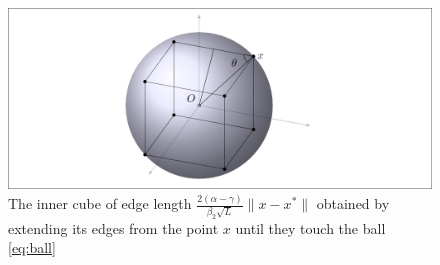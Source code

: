 \documentclass[11pt,a4paper,openright,oneside]{book}
\numberwithin{equation}{section}
\begin{document}
{\begin{figure}

\centering

\includegraphics[width=\linewidth]{media/balls.png}
  \caption{The inner cube of edge length $\frac{2(\alpha - \gamma)}{\beta_2 \sqrt{L}} \|x - x^*\|$ obtained by extending its edges from the point $x$ until they touch the ball \ref{eq:ball} }
  \label{fig:ballhd}
\end{figure}

}
\end{document}
